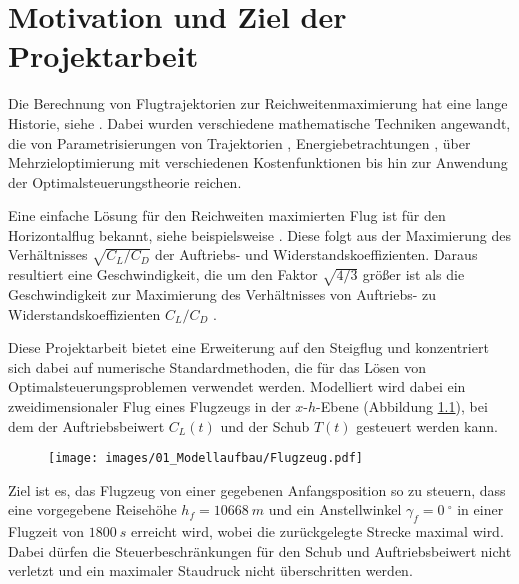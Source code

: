 \chapter{Motivation und Ziel der Projektarbeit}
Die Berechnung von Flugtrajektorien zur Reichweitenmaximierung hat eine lange Historie, siehe \cite{Burrows1982, Murrieta2016, Schaback2017, Pierson1989}.  Dabei wurden verschiedene mathematische Techniken angewandt, die von Parametrisierungen von Trajektorien \cite{Burrows1982}, Energiebetrachtungen \cite{Calise1977}, über Mehrzieloptimierung mit verschiedenen Kostenfunktionen \cite{Gardi2016} bis hin zur Anwendung der Optimalsteuerungstheorie \cite{Javier2016}  reichen. 

Eine einfache Lösung für den Reichweiten maximierten Flug ist für den Horizontalflug bekannt, siehe beispielsweise \cite{Peckham1974}. Diese folgt aus der Maximierung des Verhältnisses $\sqrt{C_{L}/C_{D}}$ der Auftriebs- und Widerstandskoeffizienten. Daraus resultiert eine Geschwindigkeit, die um den Faktor $\sqrt{4/3}$ größer ist als die Geschwindigkeit zur Maximierung des Verhältnisses von Auftriebs- zu Widerstandskoeffizienten $C_{L}/C_{D}$ \cite{Schaback2017}. 

Diese Projektarbeit bietet eine Erweiterung auf den Steigflug und konzentriert sich dabei auf numerische Standardmethoden, die für das Lösen von Optimalsteuerungsproblemen verwendet werden. Modelliert wird dabei ein zweidimensionaler Flug eines Flugzeugs in der $x$-$h$-Ebene (Abbildung \ref{img:Flugzeug}), bei dem der Auftriebsbeiwert $C_L(t)$ und der Schub $T(t)$ gesteuert werden kann.

\begin{figure}[H]
    \begin{center}
        \texttt{[image: images/01\_Modellaufbau/Flugzeug.pdf]}
        \label{img:Flugzeug}
    \end{center}
\end{figure}

Ziel ist es, das Flugzeug von einer gegebenen Anfangsposition so zu steuern, dass eine vorgegebene Reisehöhe $h_f = 10668\ m$ und ein Anstellwinkel $\gamma_f = 0\ ^{\circ}$ in einer Flugzeit von $1800 \ s$ erreicht  wird, wobei die zurückgelegte Strecke maximal wird. Dabei dürfen die Steuerbeschränkungen für den Schub und Auftriebsbeiwert nicht verletzt und ein maximaler Staudruck nicht überschritten werden. 

